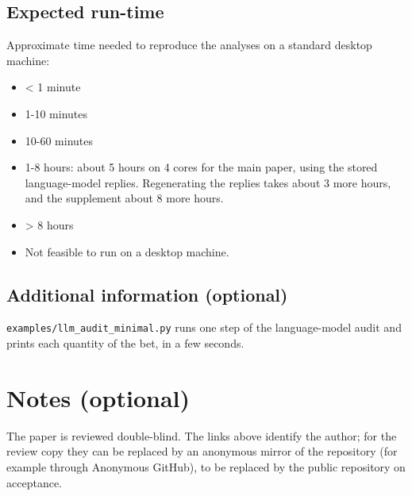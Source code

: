 \documentclass[11pt]{article}
\providecommand{\tightlist}{\setlength{\itemsep}{0pt}\setlength{\parskip}{0pt}}
\begin{document}
\hypertarget{expected-run-time}{%
\subsection{Expected run-time}\label{expected-run-time}}

Approximate time needed to reproduce the analyses on a standard desktop
machine:

\begin{itemize}
\tightlist
\item[$\square$]
  \textless{} 1 minute
\item[$\square$]
  1-10 minutes
\item[$\square$]
  10-60 minutes
\item[$\boxtimes$]
  1-8 hours: about 5 hours on 4 cores for the main paper, using the
  stored language-model replies. Regenerating the replies takes about 3
  more hours, and the supplement about 8 more hours.
\item[$\square$]
  \textgreater{} 8 hours
\item[$\square$]
  Not feasible to run on a desktop machine.
\end{itemize}

\hypertarget{additional-information-optional-2}{%
\subsection{Additional information
(optional)}\label{additional-information-optional-2}}

\texttt{examples/llm\_audit\_minimal.py} runs one step of the
language-model audit and prints each quantity of the bet, in a few
seconds.

\hypertarget{notes-optional}{%
\section{Notes (optional)}\label{notes-optional}}

The paper is reviewed double-blind. The links above identify the author;
for the review copy they can be replaced by an anonymous mirror of the
repository (for example through Anonymous GitHub), to be replaced by the
public repository on acceptance.
\end{document}
